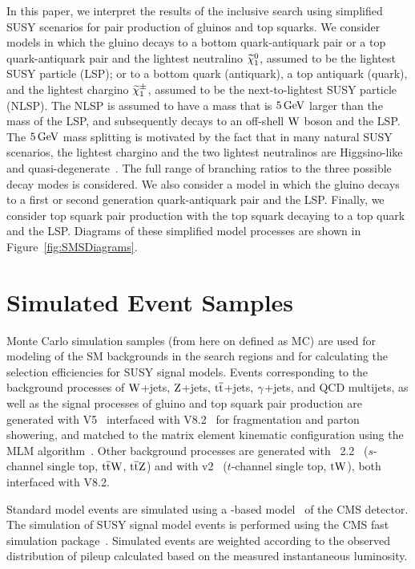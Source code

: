 In this paper, we interpret the results of the inclusive search using 
simplified SUSY scenarios for pair production of gluinos and top
squarks. We consider models in which the gluino decays to a bottom
quark-antiquark pair or a top quark-antiquark pair and the lightest
neutralino $\widetilde{\chi}^{0}_{1}$, assumed to be the lightest SUSY 
particle (LSP); or to a bottom quark (antiquark), a top antiquark (quark), and the 
lightest chargino $\widetilde{\chi}^{\pm}_{1}$, assumed to be the next-to-lightest SUSY particle (NLSP). The
NLSP is assumed to have a mass that is $5 \,\text{Ge\hspace{-.08em}V}$ larger than the mass of the LSP,
and subsequently decays to an off-shell $\mathrm{W}$ boson and the LSP. The $5 \,\text{Ge\hspace{-.08em}V}$
mass splitting is motivated by the fact that in many natural SUSY
scenarios, the lightest chargino and the two lightest neutralinos are Higgsino-like and quasi-degenerate~\cite{naturalSUSY}. The full range of 
branching ratios to the three possible decay modes is considered. We also consider
a model in which the gluino decays to a first or second generation quark-antiquark pair and the LSP.
Finally, we consider top squark pair production with the top squark decaying to
a top quark and the LSP. Diagrams of these simplified model processes
are shown in Figure~\ref{fig:SMSDiagrams}.


\section{Simulated Event Samples}
Monte Carlo simulation samples (from here on defined as MC) are used for modeling of the SM backgrounds
in the search regions and for calculating the selection efficiencies for SUSY signal models.
Events corresponding to the background processes of $\mathrm{W}$+jets, $\mathrm{Z}$+jets, $\mathrm{t}\overline{\mathrm{t}}$+jets, $\gamma$+jets,
and QCD multijets, as well as the signal processes of gluino and top squark
pair production are generated with \MADGRAPH V5~\cite{Alwall:2011uj} interfaced with \PYTHIA
V8.2~\cite{Sjostrand2008852} for fragmentation and parton
showering, and matched to the matrix element kinematic configuration using the MLM
algorithm~\cite{Hoche:2006ph}. Other background processes are generated with
\MATNLO~2.2~\cite{Alwall:2014hca} ($s$-channel single top, $\mathrm{t}\overline{\mathrm{t}}\mathrm{W}$, $\mathrm{t}\overline{\mathrm{t}}\mathrm{Z}$) and 
with \POWHEG v2~\cite{Alioli:2009je, Re:2010bp} ($t$-channel
single top, $\mathrm{t}\mathrm{W}$), both interfaced with \PYTHIA V8.2. 

Standard model events are simulated using a \GEANTfour-based model~\cite{G4} of the CMS detector.
The simulation of SUSY signal model events is performed using the CMS fast
simulation package~\cite{FastSim}. Simulated events are weighted 
according to the observed distribution of pileup calculated based on the measured 
instantaneous luminosity. 

